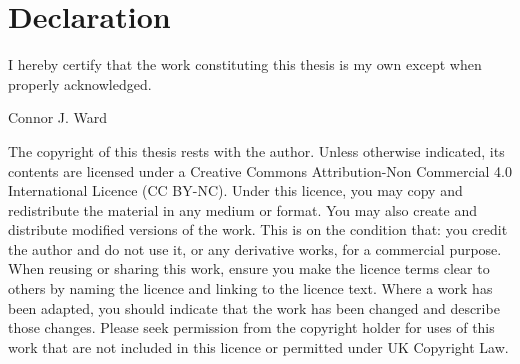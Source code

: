 \chapter*{Declaration}

\vspace{1cm}

\begin{center}
  \begin{minipage}{.7\textwidth}
    I hereby certify that the work constituting this thesis is my own except when properly acknowledged.
  \end{minipage}
\end{center}

\vspace{.6cm}

\hfill
Connor J. Ward

\vfill

The copyright of this thesis rests with the author.
Unless otherwise indicated, its contents are licensed under a Creative Commons Attribution-Non Commercial 4.0 International Licence (CC BY-NC).
Under this licence, you may copy and redistribute the material in any medium or format.
You may also create and distribute modified versions of the work.
This is on the condition that: you credit the author and do not use it, or any derivative works, for a commercial purpose.
When reusing or sharing this work, ensure you make the licence terms clear to others by naming the licence and linking to the licence text.
Where a work has been adapted, you should indicate that the work has been changed and describe those changes.
Please seek permission from the copyright holder for uses of this work that are not included in this licence or permitted under UK Copyright Law.

\clearpage
